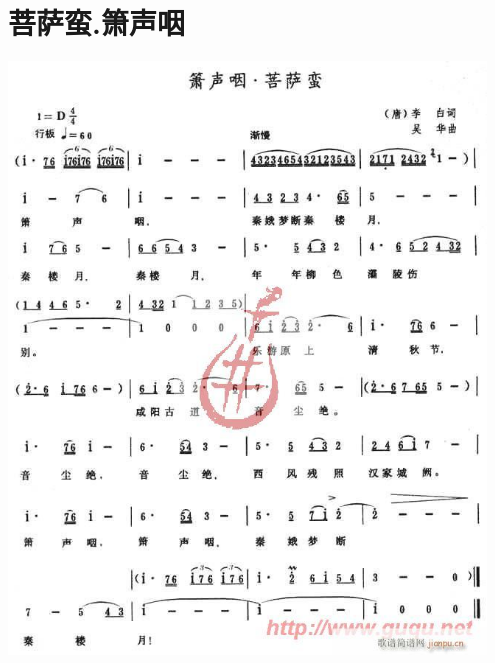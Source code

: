 \documentclass[cn,pad,twocol]{elegantbook}
\begin{document}
\section{菩萨蛮.箫声咽}
    \includegraphics[width=0.95\textwidth]{dongxiao/20200909-箫声咽-菩萨蛮.jpg}
\end{document}
